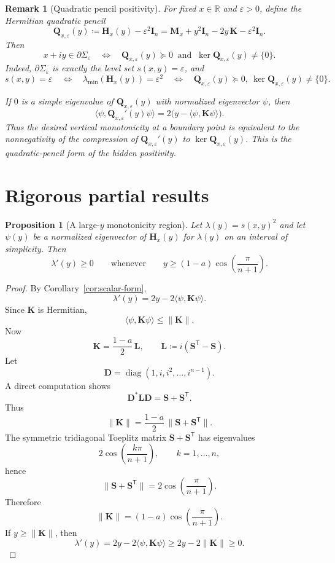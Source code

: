 \documentclass[11pt]{article}
\newtheorem{proposition}[theorem]{Proposition}
\newtheorem{remark}[theorem]{Remark}
\begin{document}
\begin{remark}[Quadratic pencil positivity]\label{rem:quadratic-pencil}
For fixed \(x\in\mathbb R\) and \(\varepsilon>0\), define the Hermitian quadratic pencil
\[
\mathbf Q_{x,\varepsilon}(y)
\coloneqq
\mathbf H_x(y)-\varepsilon^2\mathbf I_n
=
\mathbf M_x+y^2\mathbf I_n-2y\,\mathbf K-\varepsilon^2\mathbf I_n.
\]
Then
\[
x+iy\in\partial\Sigma_\varepsilon
\quad\Longleftrightarrow\quad
\mathbf Q_{x,\varepsilon}(y)\succeq 0
\ \text{ and }\
\ker \mathbf Q_{x,\varepsilon}(y)\neq\{0\}.
\]
Indeed, \(\partial\Sigma_\varepsilon\) is exactly the level set \(s(x,y)=\varepsilon\), and
\[
s(x,y)=\varepsilon
\quad\Longleftrightarrow\quad
\lambda_{\min}(\mathbf H_x(y))=\varepsilon^2
\quad\Longleftrightarrow\quad
\mathbf Q_{x,\varepsilon}(y)\succeq 0,\ \ker\mathbf Q_{x,\varepsilon}(y)\neq\{0\}.
\]

If \(0\) is a simple eigenvalue of \(\mathbf Q_{x,\varepsilon}(y)\) with normalized eigenvector \(\psi\), then
\[
\langle \psi,\mathbf Q_{x,\varepsilon}'(y)\psi\rangle
=
2\bigl(y-\langle \psi,\mathbf K\psi\rangle\bigr).
\]
Thus the desired vertical monotonicity at a boundary point is equivalent to the nonnegativity of the compression of \(\mathbf Q_{x,\varepsilon}'(y)\) to \(\ker \mathbf Q_{x,\varepsilon}(y)\).  This is the quadratic-pencil form of the hidden positivity.
\end{remark}

\section{Rigorous partial results}

\begin{proposition}[A large-\(y\) monotonicity region]\label{prop:large-y}
Let \(\lambda(y)=s(x,y)^2\) and let \(\psi(y)\) be a normalized eigenvector of \(\mathbf H_x(y)\) for \(\lambda(y)\) on an interval of simplicity. Then
\[
\lambda'(y)\ge 0
\qquad\text{whenever}\qquad
y\ge (1-a)\cos\!\left(\frac{\pi}{n+1}\right).
\]
\end{proposition}

\begin{proof}
By Corollary~\ref{cor:scalar-form},
\[
\lambda'(y)=2y-2\langle \psi,\mathbf K\psi\rangle.
\]
Since \(\mathbf K\) is Hermitian,
\[
\langle \psi,\mathbf K\psi\rangle\le \|\mathbf K\|.
\]
Now
\[
\mathbf K=\frac{1-a}{2}\,\mathbf L,
\qquad
\mathbf L\coloneqq i(\mathbf S^{\mathsf T}-\mathbf S).
\]
Let
\[
\mathbf D=\operatorname{diag}(1,i,i^2,\dots,i^{n-1}).
\]
A direct computation shows
\[
\mathbf D^*\mathbf L\mathbf D=\mathbf S+\mathbf S^{\mathsf T}.
\]
Thus
\[
\|\mathbf K\|
=
\frac{1-a}{2}\,\|\mathbf S+\mathbf S^{\mathsf T}\|.
\]
The symmetric tridiagonal Toeplitz matrix \(\mathbf S+\mathbf S^{\mathsf T}\) has eigenvalues
\[
2\cos\!\left(\frac{k\pi}{n+1}\right),\qquad k=1,\dots,n,
\]
hence
\[
\|\mathbf S+\mathbf S^{\mathsf T}\|=2\cos\!\left(\frac{\pi}{n+1}\right).
\]
Therefore
\[
\|\mathbf K\|
=
(1-a)\cos\!\left(\frac{\pi}{n+1}\right).
\]
If \(y\ge \|\mathbf K\|\), then
\[
\lambda'(y)=2y-2\langle \psi,\mathbf K\psi\rangle\ge 2y-2\|\mathbf K\|\ge 0.
\]
\end{proof}
\end{document}
